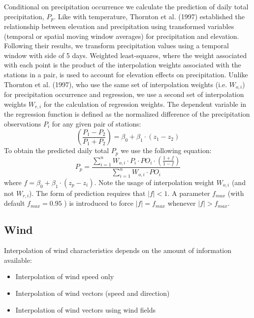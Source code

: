 \documentclass[11pt,a4paper]{article}
\begin{document}
Conditional on precipitation occurrence we calculate the prediction of daily total precipitation, $P_p$. Like with temperature, Thornton et al. (1997) established the relationship between elevation and precipitation using transformed variables (temporal or spatial moving window averages) for precipitation and elevation. Following their results, we transform precipitation values using a temporal window with side of 5 days. Weighted least-squares, where the weight associated with each point is the product of the interpolation weights associated with the stations in a pair, is used to account for elevation effects on precipitation. Unlike Thornton et al. (1997), who use the same set of interpolation weights (i.e. $W_{o,i}$) for precipitation occurrence and regression, we use a second set of interpolation weights $W_{r,i}$ for the calculation of regression weights. The dependent variable in the regression function is defined as the normalized difference of the precipitation observations $P_i$ for any given pair of stations:
\begin{equation}
\left(\frac{P_1 - P_2}{P_1 + P_2}\right) = \beta_0 + \beta_1 \cdot (z_1 - z_2)
\end{equation}
To obtain the predicted daily total $P_p$ we use the following equation:
\begin{equation}
P_p = \frac{\sum_{i=1}^{n}{W_{o,i}\cdot P_i \cdot PO_i \cdot \left(\frac{1 + f}{1 - f} \right)}}{\sum_{i=1}^{n}{W_{o,i} \cdot PO_i}}
\end{equation}
where $f = \beta_0 + \beta_1 \cdot (z_p - z_i)$. Note the usage of interpolation weight $W_{o,i}$ (and not $W_{r,i}$). The form of prediction requires that $\lvert f \rvert < 1$. A parameter $f_{max}$ (with default $f_{max} = 0.95$ ) is introduced to force $\lvert f \rvert  = f_{max}$ whenever $\lvert f \rvert  > f_{max}$.


\subsection{Wind}
Interpolation of wind characteristics depends on the amount of information available:
\begin{itemize}
\item{Interpolation of wind speed only}
\item{Interpolation of wind vectors (speed and direction)}
\item{Interpolation of wind vectors using wind fields}
\end{itemize}
\end{document}
